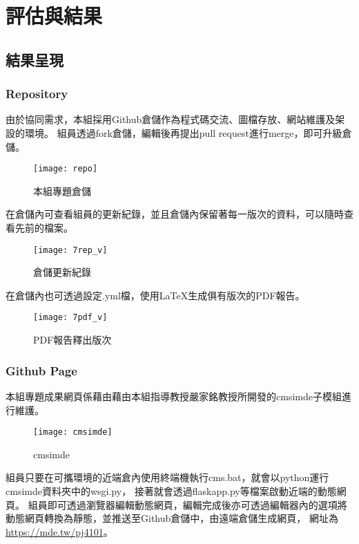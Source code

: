 \chapter{評估與結果}

\section{結果呈現}

\subsection{Repository}
由於協同需求，本組採用Github倉儲作為程式碼交流、圖檔存放、網站維護及架設的環境。
組員透過fork倉儲，編輯後再提出pull request進行merge，即可升級倉儲。

\begin{figure}[h]
    \centering
    \texttt{[image: repo]}
    \caption{本組專題倉儲}
\end{figure}

在倉儲內可查看組員的更新紀錄，並且倉儲內保留著每一版次的資料，可以隨時查看先前的檔案。

\begin{figure}[h]
    \centering
    \texttt{[image: 7rep\_v]}
    \caption{倉儲更新紀錄}
\end{figure}

在倉儲內也可透過設定.yml檔，使用LaTeX生成俱有版次的PDF報告。

\begin{figure}[h]
    \centering
    \texttt{[image: 7pdf\_v]}
    \caption{PDF報告釋出版次}
\end{figure}

\subsection{Github Page}
本組專題成果網頁係藉由藉由本組指導教授嚴家銘教授所開發的cmsimde子模組進行維護。\\

\begin{figure}[h]
    \centering
    \texttt{[image: cmsimde]}
    \caption{cmsimde}
\end{figure}

組員只要在可攜環境的近端倉內使用終端機執行cms.bat，就會以python運行cmsimde資料夾中的wsgi.py，
接著就會透過flaskapp.py等檔案啟動近端的動態網頁。
組員即可透過瀏覽器編輯動態網頁，編輯完成後亦可透過編輯器內的選項將動態網頁轉換為靜態，並推送至Github倉儲中，由遠端倉儲生成網頁，
網址為\url{https://mde.tw/pj4101}。\\

